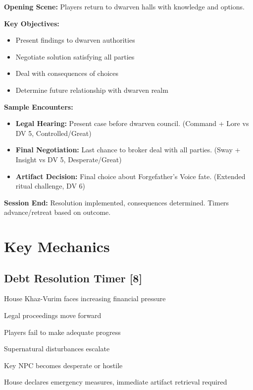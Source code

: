 \documentclass[11pt]{article}
\newenvironment{mechanics}{\begin{description}[leftmargin=*,style=standard]}{\end{description}}
\begin{document}
\textbf{Opening Scene:} Players return to dwarven halls with knowledge and options.

\textbf{Key Objectives:}
\begin{itemize}
\item Present findings to dwarven authorities
\item Negotiate solution satisfying all parties
\item Deal with consequences of choices
\item Determine future relationship with dwarven realm
\end{itemize}

\textbf{Sample Encounters:}
\begin{itemize}
\item \textbf{Legal Hearing:} Present case before dwarven council. (Command + Lore vs DV 5, Controlled/Great)
\item \textbf{Final Negotiation:} Last chance to broker deal with all parties. (Sway + Insight vs DV 5, Desperate/Great)
\item \textbf{Artifact Decision:} Final choice about Forgefather's Voice fate. (Extended ritual challenge, DV 6)
\end{itemize}

\textbf{Session End:} Resolution implemented, consequences determined. Timers advance/retreat based on outcome.

\section{Key Mechanics}

\subsection{Debt Resolution Timer [8]}
\begin{mechanics}
\item[Advance +1:] House Khaz-Vurim faces increasing financial pressure
\item[Advance +1:] Legal proceedings move forward
\item[Advance +2:] Players fail to make adequate progress
\item[Advance +1:] Supernatural disturbances escalate
\item[Advance +2:] Key NPC becomes desperate or hostile
\item[When Full:] House declares emergency measures, immediate artifact retrieval required
\end{mechanics}
\end{document}
